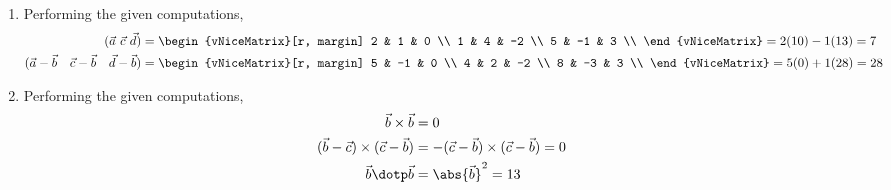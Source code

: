 \begin{enumerate}
    \item Performing the given computations,
          \begin{align}
              (\vec{a}\ \vec{c}\ \vec{d})                                         & =
              \begin{vNiceMatrix}[r, margin]
                  2 & 1  & 0  \\
                  1 & 4  & -2 \\
                  5 & -1 & 3  \\
              \end{vNiceMatrix} = 2(10) - 1(13) = 7                                   \\
              (\vec{a} - \vec{b} \quad \vec{c} - \vec{b} \quad \vec{d} - \vec{b}) & =
              \begin{vNiceMatrix}[r, margin]
                  5 & -1 & 0  \\
                  4 & 2  & -2 \\
                  8 & -3 & 3  \\
              \end{vNiceMatrix} = 5(0) + 1(28) = 28
          \end{align}

    \item Performing the given computations,
          \begin{align}
              \vec{b} \times \vec{b}                         & = 0                    \\
              (\vec{b} - \vec{c}) \times (\vec{c} - \vec{b}) & =
              - (\vec{c} - \vec{b}) \times (\vec{c} - \vec{b}) = 0                    \\
              \vec{b} \dotp \vec{b}                          & = \abs{\vec{b}}^2 = 13
          \end{align}


\end{enumerate}
